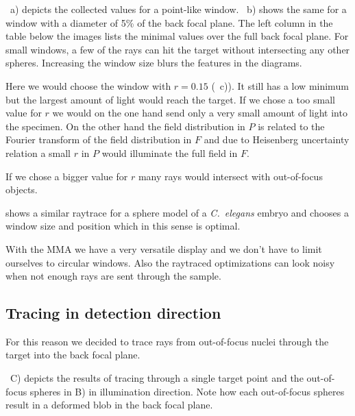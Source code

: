 ~a) depicts
the collected values for a point-like window.
~b) shows the
same for a window with a diameter of 5\% of the back focal plane. The
left column in the table below the images lists the minimal values
over the full back focal plane. For small windows, a few of the rays
can hit the target without intersecting any other spheres. Increasing
the window size blurs the features in the diagrams.

Here we would choose the window with $r=0.15$
(~c)). It
still has a low minimum but the largest amount of light would reach
the target. If we chose a too small value for $r$ we would on the one
hand send only a very small amount of light into the specimen. On the
other hand the field distribution in $P$ is related to the Fourier
transform of the field distribution in $F$ and due to Heisenberg
uncertainty relation a small $r$ in $P$ would illuminate the full
field in $F$.

If we chose a bigger value for $r$ many rays would intersect with
out-of-focus objects.
 

 shows a similar
raytrace for a sphere model of a \emph{C.~elegans} embryo and chooses
a window size and position which in this sense is optimal.

With the MMA we have a very versatile display and we don't
have to limit ourselves to circular windows. Also the raytraced
optimizations can look noisy when not enough rays are sent through the
sample.
\subsection{Tracing in detection direction}
\label{sec:trace-detect}
For this reason we decided to trace rays from out-of-focus nuclei
through the target into the back focal plane.

~C) depicts the results of tracing
through a single target point and the out-of-focus spheres in B) in
illumination direction. Note how each out-of-focus spheres result in a
deformed blob in the back focal plane. 

